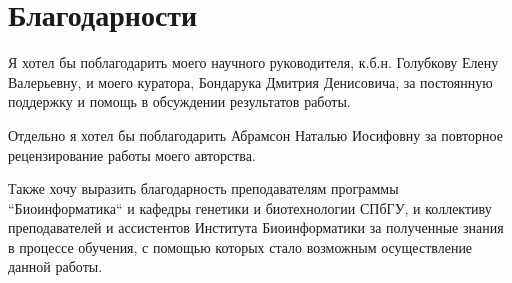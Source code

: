 \clearpage
\section{Благодарности}

Я хотел бы поблагодарить моего научного руководителя, к.б.н. Голубкову Елену Валерьевну, и моего куратора, Бондарука Дмитрия Денисовича, за постоянную поддержку и помощь в обсуждении результатов работы.

Отдельно я хотел бы поблагодарить Абрамсон Наталью Иосифовну за повторное рецензирование работы моего авторства.

Также хочу выразить благодарность преподавателям программы ``Биоинформатика`` и кафедры генетики и биотехнологии СПбГУ, и коллективу преподавателей и ассистентов Института Биоинформатики за полученные знания в процессе обучения, с помощью которых стало возможным осуществление данной работы.